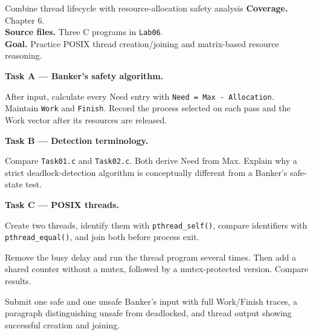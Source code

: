 \begin{labproject}{Combine thread lifecycle with resource-allocation safety analysis}
\textbf{Coverage.} Chapter 6.\\
\textbf{Source files.} Three C programs in \texttt{Lab06}.\\
\textbf{Goal.} Practice POSIX thread creation/joining and matrix-based resource reasoning.

\medskip\noindent\textbf{Task A --- Banker's safety algorithm.}\par
After input, calculate every Need entry with \texttt{Need = Max - Allocation}. Maintain \texttt{Work} and \texttt{Finish}. Record the process selected on each pass and the Work vector after its resources are released.

\medskip\noindent\textbf{Task B --- Detection terminology.}\par
Compare \texttt{Task01.c} and \texttt{Task02.c}. Both derive Need from Max. Explain why a strict deadlock-detection algorithm is conceptually different from a Banker's safe-state test.

\medskip\noindent\textbf{Task C --- POSIX threads.}\par
Create two threads, identify them with \texttt{pthread\_self()}, compare identifiers with \texttt{pthread\_equal()}, and join both before process exit.

\begin{tryit}
Remove the busy delay and run the thread program several times. Then add a shared counter without a mutex, followed by a mutex-protected version. Compare results.
\end{tryit}
\end{labproject}

\begin{labdeliverable}
Submit one safe and one unsafe Banker's input with full Work/Finish traces, a paragraph distinguishing unsafe from deadlocked, and thread output showing successful creation and joining.
\end{labdeliverable}
